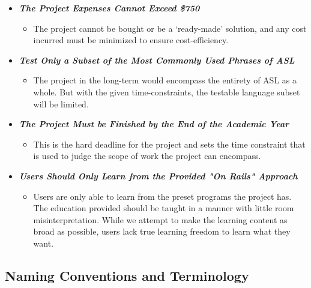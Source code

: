 \documentclass[12pt, titlepage]{article}
\begin{document}
\begin{itemize}
    \item[] \textbf{\textit{The Project Expenses Cannot Exceed \$750}}
    \begin{itemize}
        \item The project cannot be bought or be a `ready-made' solution, and any cost incurred must be minimized to ensure cost-efficiency.
    \end{itemize}
    \item[] \textbf{\textit{Test Only a Subset of the Most Commonly Used Phrases of ASL}}
    \begin{itemize}
        \item The project in the long-term would encompass the entirety of ASL as a whole. But with the given time-constraints, the testable language subset will be limited.
    \end{itemize}
    \item[] \textbf{\textit{The Project Must be Finished by the End of the Academic Year}}
    \begin{itemize}
        \item This is the hard deadline for the project and sets the time constraint that is used to judge the scope of work the project can encompass.
    \end{itemize}
    \item[] \textbf{\textit{Users Should Only Learn from the Provided "On Rails" Approach}}
    \begin{itemize}
        \item Users are only able to learn from the preset programs the project has. The education provided should be taught in a manner with little room misinterpretation. While we attempt to make the learning content as broad as possible, users lack true learning freedom to learn what they want.
    \end{itemize}
\end{itemize}

\subsection{Naming Conventions and Terminology}
\end{document}

